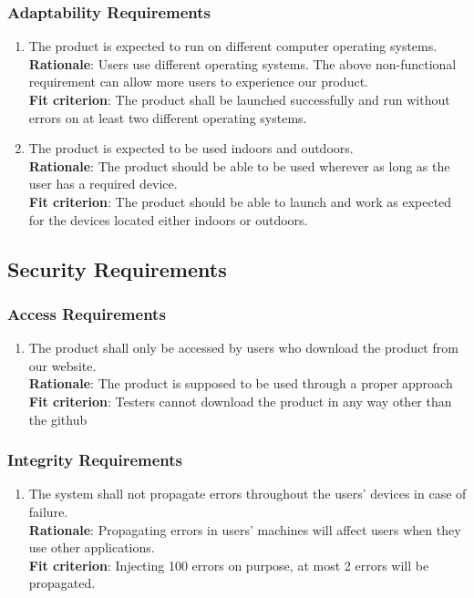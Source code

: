 \documentclass{article}
\begin{document}
\subsubsection{Adaptability Requirements}
\begin{enumerate}[MS3.1]
    \item The product is expected to run on different computer operating systems.\\
    \textbf{Rationale}: Users use different operating systems. The above 
    non-functional requirement can allow more users to experience our product.\\
    \textbf{Fit criterion}: The product shall be launched successfully and run without errors on at least two different operating systems.\\
    \item The product is expected to be used indoors and outdoors.\\
    \textbf{Rationale}: The product should be able to be used wherever as long as the user has a required device.\\
    \textbf{Fit criterion}: The product should be able to launch and work as expected for the devices located either indoors or outdoors. \\
\end{enumerate}
\subsection{Security Requirements}
\subsubsection{Access Requirements}
\begin{enumerate}[SR1.1]
    \item The product shall only be accessed by users who download the product from our website.\\
    \textbf{Rationale}: The product is supposed to be used through a proper approach\\
    \textbf{Fit criterion}: Testers cannot download the product in any way other than the github\\
\end{enumerate}
\subsubsection{Integrity Requirements}
\begin{enumerate}[SR2.1]
    \item The system shall not propagate errors throughout the users' devices in case of failure.\\
    \textbf{Rationale}: Propagating errors in users' machines will affect
    users when they use other applications.\\
    \textbf{Fit criterion}: Injecting 100 errors on purpose, at most 2 errors
    will be propagated.\\
\end{enumerate}
\end{document}
